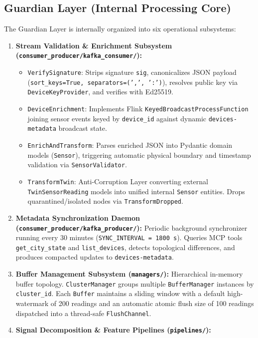 \documentclass[10pt,a4paper]{report}
\begin{document}
\subsection{Guardian Layer (Internal Processing Core)}
The Guardian Layer is internally organized into six operational subsystems:
\begin{enumerate}
  \item \textbf{Stream Validation \& Enrichment Subsystem (\texttt{consumer\_producer/kafka\_consumer/}):}
  \begin{itemize}
    \item \texttt{VerifySignature}: Strips signature \texttt{sig}, canonicalizes JSON payload (\texttt{sort\_keys=True, separators=(',', ':')}), resolves public key via \texttt{DeviceKeyProvider}, and verifies with Ed25519.
    \item \texttt{DeviceEnrichment}: Implements Flink \texttt{KeyedBroadcastProcessFunction} joining sensor events keyed by \texttt{device\_id} against dynamic \texttt{devices-metadata} broadcast state.
    \item \texttt{EnrichAndTransform}: Parses enriched JSON into Pydantic domain models (\texttt{Sensor}), triggering automatic physical boundary and timestamp validation via \texttt{SensorValidator}.
    \item \texttt{TransformTwin}: Anti-Corruption Layer converting external \texttt{TwinSensorReading} models into unified internal \texttt{Sensor} entities. Drops quarantined/isolated nodes via \texttt{TransformDropped}.
  \end{itemize}
  \item \textbf{Metadata Synchronization Daemon (\texttt{consumer\_producer/kafka\_producer/}):}
  Periodic background synchronizer running every 30 minutes (\texttt{SYNC\_INTERVAL = 1800\,s}). Queries MCP tools \texttt{get\_city\_state} and \texttt{list\_devices}, detects topological differences, and produces compacted updates to \texttt{devices-metadata}.
  \item \textbf{Buffer Management Subsystem (\texttt{managers/}):}
  Hierarchical in-memory buffer topology. \texttt{ClusterManager} groups multiple \texttt{BufferManager} instances by \texttt{cluster\_id}. Each \texttt{Buffer} maintains a sliding window with a default high-watermark of 200 readings and an automatic atomic flush size of 100 readings dispatched into a thread-safe \texttt{FlushChannel}.
  \item \textbf{Signal Decomposition \& Feature Pipelines (\texttt{pipelines/}):}
  \begin{itemize}

\end{itemize}
\end{enumerate}
\end{document}
